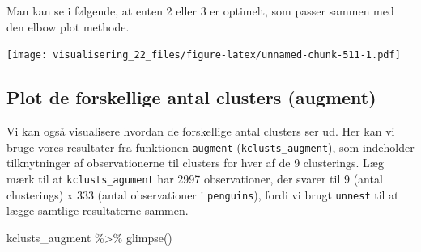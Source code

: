 \documentclass[
]{book}
\newenvironment{Shaded}{\begin{snugshade}}{\end{snugshade}}
\newcommand{\AttributeTok}[1]{\textcolor[rgb]{0.77,0.63,0.00}{#1}}
\newcommand{\DecValTok}[1]{\textcolor[rgb]{0.00,0.00,0.81}{#1}}
\newcommand{\FunctionTok}[1]{\textcolor[rgb]{0.00,0.00,0.00}{#1}}
\newcommand{\NormalTok}[1]{#1}
\newcommand{\SpecialCharTok}[1]{\textcolor[rgb]{0.00,0.00,0.00}{#1}}
\newcommand{\StringTok}[1]{\textcolor[rgb]{0.31,0.60,0.02}{#1}}
\begin{document}
Man kan se i følgende, at enten 2 eller 3 er optimelt, som passer sammen med den elbow plot methode.

\begin{Shaded}
\end{Shaded}

\texttt{[image: visualisering\_22\_files/figure-latex/unnamed-chunk-511-1.pdf]}

\hypertarget{plot-de-forskellige-antal-clusters-augment}{%
\subsection{Plot de forskellige antal clusters (augment)}\label{plot-de-forskellige-antal-clusters-augment}}

Vi kan også visualisere hvordan de forskellige antal clusters ser ud. Her kan vi bruge vores resultater fra funktionen \texttt{augment} (\texttt{kclusts\_augment}), som indeholder tilknytninger af observationerne til clusters for hver af de 9 clusterings. Læg mærk til at \texttt{kclusts\_agument} har 2997 observationer, der svarer til 9 (antal clusterings) x 333 (antal observationer i \texttt{penguins}), fordi vi brugt \texttt{unnest} til at lægge samtlige resultaterne sammen.

\begin{Shaded}
\begin{Highlighting}[]
\NormalTok{kclusts\_augment }\SpecialCharTok{\%\textgreater{}\%} \FunctionTok{glimpse}\NormalTok{()}
\end{Highlighting}
\end{Shaded}
\end{document}
